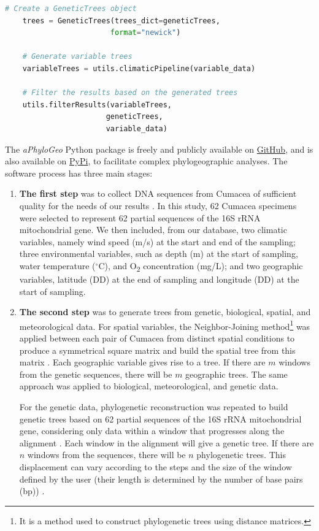 {\begin{lstlisting}[label=lst:main,language=Python,caption=Main script for tutorial using the aPhyloGeo package.]
    # Create a GeneticTrees object
    trees = GeneticTrees(trees_dict=geneticTrees, 
                        format="newick")

    # Generate variable trees
    variableTrees = utils.climaticPipeline(variable_data)

    # Filter the results based on the generated trees
    utils.filterResults(variableTrees, 
                       geneticTrees, 
                       variable_data)
\end{lstlisting}

The \textit{aPhyloGeo} Python package is freely and publicly available on \href{https://github.com/tahiri-lab/aPhyloGeo}{GitHub}, and is also available on \href{https://pypi.org/project/aphylogeo/}{PyPi}, to facilitate complex phylogeographic analyses. The software process has three main stages:

\begin{enumerate}
\item \textbf{The first step} was to collect DNA sequences from Cumacea of sufficient quality for the needs of our results \citep{koshkarov_phylogeography_2022}. In this study, 62 Cumacea specimens were selected to represent 62 partial sequences of the 16S rRNA mitochondrial gene. We then included, from our database, two climatic variables, namely wind speed (m/s) at the start and end of the sampling; three environmental variables, such as depth (m) at the start of sampling, water temperature ($^\circ$C), and O\textsubscript{2} concentration (mg/L); and two geographic variables, latitude (DD) at the end of sampling and longitude (DD) at the start of sampling.

\item \textbf{The second step} was to generate trees from genetic, biological, spatial, and meteorological data. For spatial variables, the {Neighbor-Joining method}\footnote{It is a method used to construct phylogenetic trees using distance matrices.} was applied between each pair of Cumacea from distinct spatial conditions to produce a symmetrical square matrix and build the spatial tree from this matrix \citep{koshkarov_phylogeography_2022}. Each geographic variable gives rise to a tree. If there are $m$ windows from the genetic sequences, there will be $m$ geographic trees. The same approach was applied to biological, meteorological, and genetic data.

For the genetic data, phylogenetic reconstruction was repeated to build genetic trees based on 62 partial sequences of the 16S rRNA mitochondrial gene, considering only data within a window that progresses along the alignment \citep{koshkarov_phylogeography_2022}. Each window in the alignment will give a genetic tree. If there are $n$ windows from the sequences, there will be $n$ phylogenetic trees. This displacement can vary according to the steps and the size of the window defined by the user (their length is determined by the number of base pairs (bp)) \citep{koshkarov_phylogeography_2022}.


\end{enumerate}}
